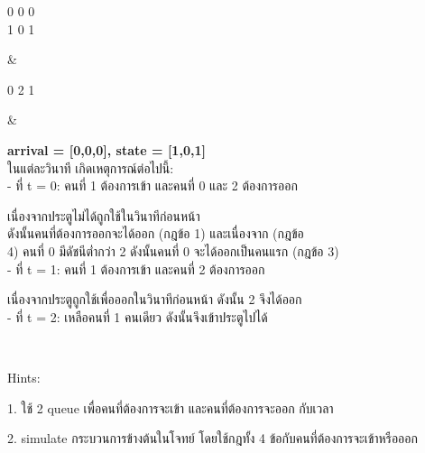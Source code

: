 \documentclass{article}
\begin{document}
{\begin{longtable}[]
\begin{minipage}[t]{\linewidth}
0 0 0\\

1 0 1\\

\strut

\end{minipage} & \begin{minipage}[t]{\linewidth}\raggedright

0 2 1\\

\strut

\end{minipage} & \begin{minipage}[t]{\linewidth}\raggedright

\textbf{arrival = {[}0,0,0{]}, state = {[}1,0,1{]}\\

}ในแต่ละวินาที เกิดเหตุการณ์ต่อไปนี้:\\

- ที่ t = 0: คนที่ 1 ต้องการเข้า และคนที่ 0 และ 2 ต้องการออก

เนื่องจากประตูไม่ได้ถูกใช้ในวินาทีก่อนหน้า\\

ดังนั้นคนที่ต้องการออกจะได้ออก (กฎข้อ 1) และเนื่องจาก (กฎข้อ\\

4) คนที่ 0 มีดัชนีต่ำกว่า 2 ดังนั้นคนที่ 0 จะได้ออกเป็นคนแรก (กฎข้อ 3)\\

- ที่ t = 1: คนที่ 1 ต้องการเข้า และคนที่ 2 ต้องการออก

เนื่องจากประตูถูกใช้เพื่อออกในวินาทีก่อนหน้า ดังนั้น 2 จึงได้ออก\\

- ที่ t = 2: เหลือคนที่ 1 คนเดียว ดังนั้นจึงเข้าประตูไปได้\\

\strut

\end{minipage} \\

\end{longtable}

}



Hints:



1. ใช้ 2 queue เพื่อคนที่ต้องการจะเข้า และคนที่ต้องการจะออก กับเวลา



2. simulate กระบวนการข้างต้นในโจทย์ โดยใช้กฎทั้ง 4 ข้อกับคนที่ต้องการจะเข้าหรือออก
\end{document}
